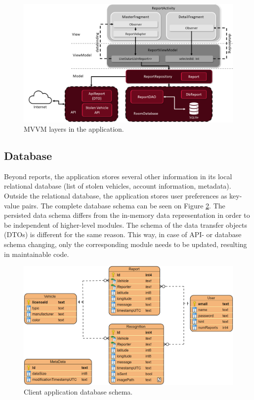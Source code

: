 \begin{figure}[htb]
 \centerline{\includegraphics[width=1.0\columnwidth]{.//Figure/System/AndroidArchitecture.png}}
 \caption{MVVM layers in the application.}
 \label{fig:AndroidArchitecture}
\end{figure}

\newpage
\subsection{Database}

Beyond reports, the application stores several other information in its local relational database (list of stolen vehicles, account information, metadata). Outside the relational database, the application stores user preferences as key-value pairs. The complete database schema can be seen on Figure \ref{fig:AppData}. The persisted data schema differs from the in-memory data representation in order to be independent of higher-level modules. The schema of the data transfer objects (DTOs) is different for the same reason. This way, in case of API- or database schema changing, only the corresponding module needs to be updated, resulting in maintainable code.

\begin{figure}[H]
 \centerline{\includegraphics[width=1.0\columnwidth]{.//Figure/System/AppData.png}}
 \caption{Client application database schema.}
 \label{fig:AppData}
\end{figure}

